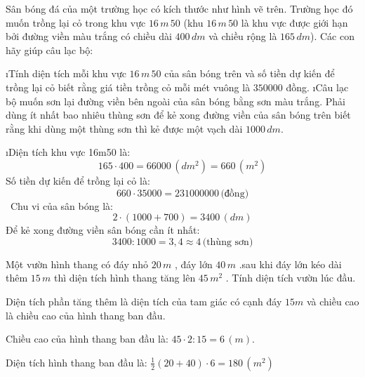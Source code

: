 \begin{bt}
	Sân bóng đá của một trường học có kích thước như hình vẽ trên. Trường học đó muốn trồng lại cỏ trong khu vực $16\,m\, 50$ (khu $16\,m\,50$ là khu vực được giới hạn bởi đường viền màu trắng có chiều dài $400\, dm$ và chiều rộng là $165\,dm$). Các con hãy giúp câu lạc bộ:
	\begin{enumerate}[a), leftmargin=*]
		\i Tính diện tích mỗi khu vực $16\,m\,50$ của sân bóng trên và số tiền dự kiến để trồng lại cỏ biết rằng giá tiền trồng cỏ mỗi mét vuông là $350000$ đồng.
		\i Câu lạc bộ muốn sơn lại đường viền bên ngoài của sân bóng bằng sơn màu trắng. Phải dùng ít nhất bao nhiêu thùng sơn để kẻ xong đường viền của sân bóng trên biết rằng khi dùng một thùng sơn thì kẻ được một vạch dài $1000 \,dm$.
	\end{enumerate}
	\begin{loigiaichuong37}
		\begin{enumerate}[a), leftmargin=*]
			\i Diện tích khu vực 16m50 là: 
			\[165\cdot400=66000 \,(dm^2)=660 \,(m^2)\] 
			Số tiền dự kiến để trồng lại cỏ là: 
			\[660\cdot35000=231000000 \,\text{(đồng)}\]
			\ Chu vi của sân bóng là: 
			\[2\cdot(1000+700)=3400 \,(dm)\] 
			Để kẻ xong đường viền sân bóng cần ít nhất: 
			\[3400:1000=3,4\approx 4\,  \text{(thùng sơn)}\]
		\end{enumerate}
	\end{loigiaichuong37}
\end{bt}
\begin{bt}
	Một vườn hình thang có đáy nhỏ $20\,m$ , đáy lớn  $40\,m$ .sau khi đáy lớn kéo dài thêm  $15\,m$ thì diện tích hình thang tăng lên  $45 \, m^2$ . Tính diện tích vườn lúc đầu.
	\begin{loigiaichuong37}
		Diện tích phần tăng thêm là diện tích của tam giác có cạnh đáy  $15m$ và chiều cao là chiều cao của hình thang ban đầu.
		
		Chiều cao của hình thang ban đầu là:  $45\cdot2:15=6 \,(m).$
		 
		Diện tích hình thang ban đầu là:  $\frac{1}{2}(20+40)\cdot6=180\, (m^2)$ 
	\end{loigiaichuong37}
\end{bt} 
